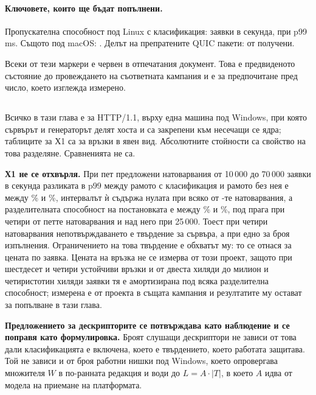 \paragraph{Ключовете, които ще бъдат попълнени.} Пропускателна способност под Linux с
класификация:  заявки в
секунда, при p99 \,ms. Същото
под macOS: . Делът на
препратените QUIC пакети:  от
 получени.

Всеки от тези маркери е червен в отпечатания документ. Това е предвиденото състояние до
провеждането на съответната кампания и е за предпочитане пред число, което изглежда
измерено.

\subsection{}

Всичко в тази глава е за HTTP/1.1, върху една машина под Windows, при която сървърът и
генераторът делят хоста и са закрепени към несечащи се ядра; таблиците за Х1 са за връзки в
явен вид. Абсолютните стойности са свойство на това разделяне. Сравненията не са.

\textbf{Х1 не се отхвърля.} При пет предложени натоварвания от 10\,000 до 70\,000 заявки в
секунда разликата в p99 между рамото с класификация и рамото без нея е между
\% и \%, интервалът ѝ съдържа нулата при всяко
от -те натоварвания, а разделителната способност на постановката е между
\% и \%, под прага при четири от
петте натоварвания и над него при 25\,000. Тоест при четири натоварвания непотвърждаването е
твърдение за сървъра, а при едно за броя изпълнения. Ограничението на това твърдение е
обхватът му: то се отнася за цената по заявка. Цената на връзка не се измерва от този проект,
защото при шестдесет и четири устойчиви връзки и от двеста хиляди до милион и четиристотин
хиляди заявки тя е амортизирана под всяка разделителна способност; измерена е от проекта
 в същата кампания и резултатите му остават за попълване в тази глава.

\textbf{Предложението за дескрипторите се потвърждава като наблюдение и се поправя като
формулировка.} Броят слушащи дескриптори не зависи от това дали класификацията е включена,
което е твърдението, което работата защитава. Той не зависи и от броя работни нишки под
Windows, което опровергава множителя \(W\) в по-ранната редакция и води до \(L = A \cdot
|T|\), в което \(A\) идва от модела на приемане на платформата.

